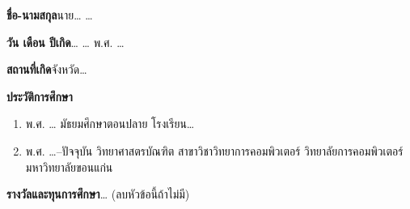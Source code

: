 \noindent\textbf{ชื่อ-นามสกุล}\quad นาย\ldots{} \ldots{}

\noindent\textbf{วัน เดือน ปีเกิด}\quad \ldots{} \ldots{} พ.ศ. \ldots{}

\noindent\textbf{สถานที่เกิด}\quad จังหวัด\ldots{}

\noindent\textbf{ประวัติการศึกษา}
\begin{enumerate}
  \item พ.ศ. \ldots{} มัธยมศึกษาตอนปลาย โรงเรียน\ldots{}
  \item พ.ศ. \ldots{}--ปัจจุบัน วิทยาศาสตรบัณฑิต สาขาวิชาวิทยาการคอมพิวเตอร์
        วิทยาลัยการคอมพิวเตอร์ มหาวิทยาลัยขอนแก่น
\end{enumerate}

\noindent\textbf{รางวัลและทุนการศึกษา}\quad \ldots{} (ลบหัวข้อนี้ถ้าไม่มี)

\vspace{\baselineskip}

